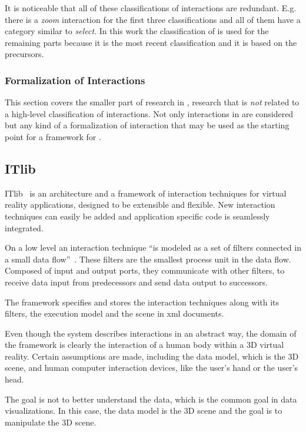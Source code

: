 It is noticeable that all of these classifications of interactions are redundant.
E.g. there is a \emph{zoom} interaction for the first three classifications and all of them have a category similar to \emph{select}.
In this work the classification of \textcite{Yi2007} is used for the remaining parts because it is the most recent classification and it is based on the precursors.

\subsubsection{Formalization of Interactions}

This section covers the smaller part of research in \cmvs{}, research that is \emph{not} related to a high-level classification of interactions.
Not only interactions in \cmvs{} are considered but any kind of a formalization of interaction that may be used as the starting point for a framework for \cmvs{}.

\subsection{ITlib}
ITlib~\parencite{Figueroa2001} is an architecture and a framework of interaction techniques for virtual reality applications, designed to be extensible and flexible.
New interaction techniques can easily be added and application specific code is seamlessly integrated.

On a low level an interaction technique ``is modeled as a set of filters connected in a small data flow''~\parencite[p.~2]{Figueroa2001}.
These filters are the smallest process unit in the data flow.
Composed of input and output ports, they communicate with other filters, to receive data input from predecessors and send data output to successors.

The framework specifies and stores the interaction techniques along with its filters, the execution model and the scene in \gls{xml} documents.

Even though the system describes interactions in an abstract way, the domain of the framework is clearly the interaction of a human body within a 3D virtual reality.
Certain assumptions are made, including the data model, which is the 3D scene, and human computer interaction devices, like the user's hand or the user's head.

The goal is not to better understand the data, which is the common goal in data visualizations.
In this case, the data model is the 3D scene and the goal is to manipulate the 3D scene.


